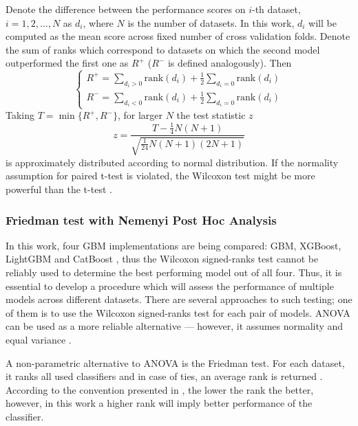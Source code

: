\documentclass[magisterska, english]{pwr_wmat_praca_dyplomowa}
\theoremstyle{plain}
\numberwithin{theorem}{chapter}
\theoremstyle{definition}
\numberwithin{theorem}{chapter}
\newcommand{\gbm}{GBM, XGBoost, LightGBM and CatBoost }
\begin{document}
Denote the difference between the performance scores on $i$-th dataset, $i=1,2,\ldots, N$ as $d_i$, where $N$ is the number of datasets. In this work, $d_i$ will be computed as the mean score across fixed number of cross validation folds. Denote the sum of ranks which correspond to datasets on which the second model outperformed the first one as $R^+$ ($R^-$ is defined analogously). Then \cite{demsar}
\begin{equation}
\begin{cases}
    \displaystyle R^+ = \sum_{d_i>0}\mathrm{rank}(d_i) + \frac12\sum_{d_i=0}\mathrm{rank}(d_i)\\
    \displaystyle R^- = \sum_{d_i<0}\mathrm{rank}(d_i) + \frac12\sum_{d_i=0}\mathrm{rank}(d_i)
\end{cases}
\end{equation}
Taking $T=\min\{R^+, R^-\}$, for larger $N$  the test statistic $z$ \cite{demsar}
\begin{equation}
z = \frac{T-\frac 14 N(N+1)}{\sqrt{\frac{1}{24}N(N+1)(2N+1)}}
\end{equation}
is approximately distributed according to normal distribution. If the normality assumption for paired t-test is violated, the Wilcoxon test might be more powerful than the t-test \cite{demsar}.

\subsubsection{Friedman test with Nemenyi Post Hoc Analysis}
In this work, four GBM implementations are being compared: \gbm, thus the Wilcoxon signed-ranks test cannot be reliably used to determine the best performing model out of all four. Thus, it is essential to develop a procedure which will assess the performance of multiple models across different datasets. There are several approaches to such testing; one of them is to use the Wilcoxon signed-ranks test for each pair of models. ANOVA can be used as a more reliable alternative --- however, it assumes normality and equal variance \cite{demsar}.

A non-parametric alternative to ANOVA is the Friedman test. For each dataset, it ranks all used classifiers and in case of ties, an average rank is returned \cite{demsar}. According to the convention presented in \cite{demsar}, the lower the rank the better, however, in this work a higher rank will imply better performance of the classifier.
\end{document}
